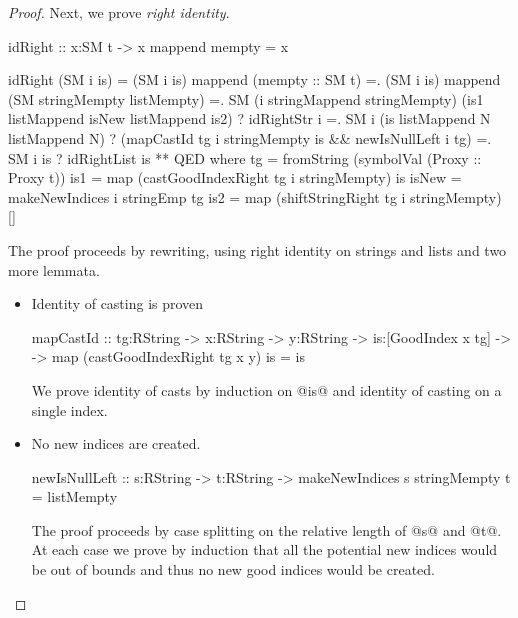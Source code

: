 \begin{proof}
Next, we prove \textit{right identity}.
\begin{code}
  idRight :: x:SM t -> {x mappend mempty = x}
  
  idRight (SM i is)
    =  (SM i is) mappend (mempty :: SM t)
    =. (SM i is) mappend (SM stringMempty listMempty)
    =. SM (i stringMappend stringMempty) (is1 listMappend isNew listMappend is2)
       ? idRightStr i
    =. SM i (is listMappend N listMappend N)
       ? (mapCastId tg i stringMempty is && newIsNullLeft i tg)
    =. SM i is
       ? idRightList is
    **  QED
    where
      tg    = fromString (symbolVal (Proxy :: Proxy t))
      is1   = map (castGoodIndexRight tg i stringMempty) is
      isNew = makeNewIndices i stringEmp tg
      is2   = map (shiftStringRight tg i stringMempty) []
\end{code}
The proof proceeds by rewriting,
using right identity on strings and lists and two more lemmata.
\begin{itemize}
\item Identity of casting is proven
\begin{code}
  mapCastId 
    :: tg:RString -> x:RString -> y:RString
    -> is:[GoodIndex x tg] ->
    -> {map (castGoodIndexRight tg x y) is = is}
\end{code}
We prove identity of casts by induction on @is@ and
identity of casting on a single index.
\item No new indices are created.
\begin{code}
  newIsNullLeft :: s:RString -> t:RString
                -> {makeNewIndices s stringMempty t = listMempty}
\end{code}
The proof proceeds by case splitting
on the relative length of @s@ and @t@.
At each case we prove by induction that all
the potential new indices would be out of bounds and thus
no new good indices would be created.
\end{itemize}


\end{proof}
